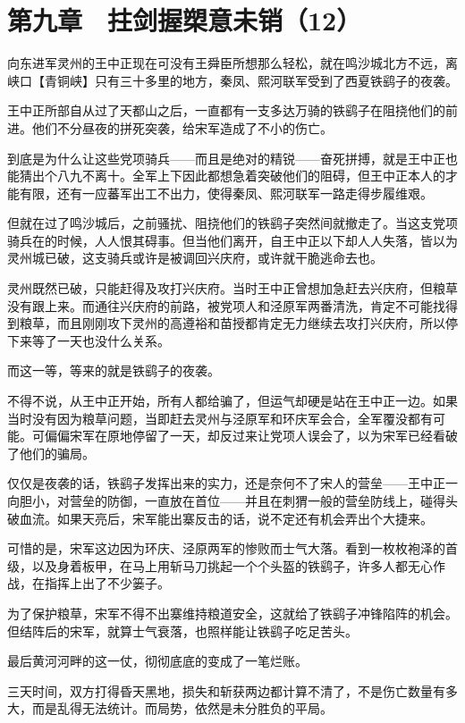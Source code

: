 \section{第九章　拄剑握槊意未销（12）}

向东进军灵州的王中正现在可没有王舜臣所想那么轻松，就在鸣沙城北方不远，离峡口【青铜峡】只有三十多里的地方，秦凤、熙河联军受到了西夏铁鹞子的夜袭。

王中正所部自从过了天都山之后，一直都有一支多达万骑的铁鹞子在阻挠他们的前进。他们不分昼夜的拼死突袭，给宋军造成了不小的伤亡。

到底是为什么让这些党项骑兵——而且是绝对的精锐——奋死拼搏，就是王中正也能猜出个八九不离十。全军上下因此都想急着突破他们的阻碍，但王中正本人的才能有限，还有一应蕃军出工不出力，使得秦凤、熙河联军一路走得步履维艰。

但就在过了鸣沙城后，之前骚扰、阻挠他们的铁鹞子突然间就撤走了。当这支党项骑兵在的时候，人人恨其碍事。但当他们离开，自王中正以下却人人失落，皆以为灵州城已破，这支骑兵或许是被调回兴庆府，或许就干脆逃命去也。

灵州既然已破，只能赶得及攻打兴庆府。当时王中正曾想加急赶去兴庆府，但粮草没有跟上来。而通往兴庆府的前路，被党项人和泾原军两番清洗，肯定不可能找得到粮草，而且刚刚攻下灵州的高遵裕和苗授都肯定无力继续去攻打兴庆府，所以停下来等了一天也没什么关系。

而这一等，等来的就是铁鹞子的夜袭。

不得不说，从王中正开始，所有人都给骗了，但运气却硬是站在王中正一边。如果当时没有因为粮草问题，当即赶去灵州与泾原军和环庆军会合，全军覆没都有可能。可偏偏宋军在原地停留了一天，却反过来让党项人误会了，以为宋军已经看破了他们的骗局。

仅仅是夜袭的话，铁鹞子发挥出来的实力，还是奈何不了宋人的营垒——王中正一向胆小，对营垒的防御，一直放在首位——并且在刺猬一般的营垒防线上，碰得头破血流。如果天亮后，宋军能出寨反击的话，说不定还有机会弄出个大捷来。

可惜的是，宋军这边因为环庆、泾原两军的惨败而士气大落。看到一枚枚袍泽的首级，以及身着板甲，在马上用斩马刀挑起一个个头盔的铁鹞子，许多人都无心作战，在指挥上出了不少篓子。

为了保护粮草，宋军不得不出寨维持粮道安全，这就给了铁鹞子冲锋陷阵的机会。但结阵后的宋军，就算士气衰落，也照样能让铁鹞子吃足苦头。

最后黄河河畔的这一仗，彻彻底底的变成了一笔烂账。

三天时间，双方打得昏天黑地，损失和斩获两边都计算不清了，不是伤亡数量有多大，而是乱得无法统计。而局势，依然是未分胜负的平局。

